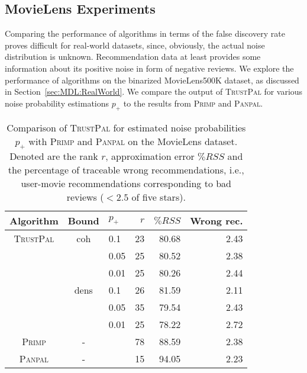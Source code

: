 \subsection{MovieLens Experiments}
Comparing the performance of algorithms in terms of the false discovery rate proves difficult for real-world datasets, since, obviously, the actual noise distribution is unknown. Recommendation data at least provides some information about its positive noise in form of negative reviews. We explore the performance of algorithms on the binarized MovieLens500K dataset, as discussed in Section~\ref{sec:MDL:RealWorld}. We compare the output of \textsc{TrustPal} for various noise probability estimations $p_+$ to the results from \textsc{Primp} and \textsc{Panpal}.
\begin{table}
\centering
	\begin{tabular}{cclrrr}\toprule
     Algorithm & Bound& $p_+$& $r$ & $\%RSS$ & Wrong rec.\\ \midrule
\textsc{TrustPal} & coh & 0.1	&23	&80.68	&2.43\\
 & & 0.05	&25	&80.52	&2.38\\
 & & 0.01	&25	&80.26	&2.44\\
 & dens & 0.1	&26	&81.59	&2.11\\
 & & 0.05	&35	&79.54	&2.43\\
 & & 0.01	&25	&78.22	&2.72\\
\textsc{Primp} &-&& 78 & 88.59 & 2.38\\
\textsc{Panpal} &-&& 15 & 94.05 & 2.23\\
\bottomrule
\end{tabular}
\caption{Comparison of \textsc{TrustPal} for estimated noise probabilities $p_+$ with \textsc{Primp} and \textsc{Panpal} on the MovieLens dataset. Denoted are the rank $r$, approximation error $\%RSS$ and the percentage of traceable wrong recommendations, i.e., user-movie recommendations corresponding to bad reviews ($<2.5$ of five stars).}
\label{tbl:TP:movielens}
\end{table}

